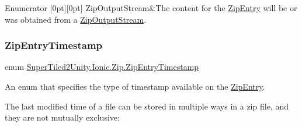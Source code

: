 \begin{DoxyEnumFields}{Enumerator}
[0pt][0pt]{}\mbox{\label{namespace_super_tiled2_unity_1_1_ionic_1_1_zip_a9ced5352c56e7e0fceff15b534073c83a93aca5a1a0fbd46c00163b840a8d96d5}} 
Zip\+Output\+Stream&The content for the \mbox{\hyperlink{class_super_tiled2_unity_1_1_ionic_1_1_zip_1_1_zip_entry}{Zip\+Entry}} will be or was obtained from a {\ttfamily \mbox{\hyperlink{class_super_tiled2_unity_1_1_ionic_1_1_zip_1_1_zip_output_stream}{Zip\+Output\+Stream}}}. \\
\hline

\end{DoxyEnumFields}
\mbox{\label{namespace_super_tiled2_unity_1_1_ionic_1_1_zip_afa5034d6b4915c0633b590a28622f7fd}} 
\subsubsection{\texorpdfstring{Zip\+Entry\+Timestamp}{ZipEntryTimestamp}}
{\footnotesize\ttfamily enum \mbox{\hyperlink{namespace_super_tiled2_unity_1_1_ionic_1_1_zip_afa5034d6b4915c0633b590a28622f7fd}{Super\+Tiled2\+Unity.\+Ionic.\+Zip.\+Zip\+Entry\+Timestamp}}\hspace{0.3cm}{\ttfamily [strong]}}



An enum that specifies the type of timestamp available on the \mbox{\hyperlink{class_super_tiled2_unity_1_1_ionic_1_1_zip_1_1_zip_entry}{Zip\+Entry}}. 

The last modified time of a file can be stored in multiple ways in a zip file, and they are not mutually exclusive\+: 


